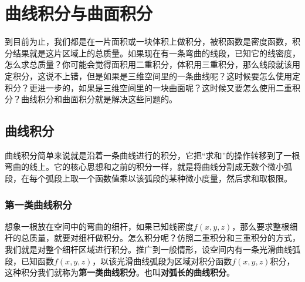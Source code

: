 \chapter{曲线积分与曲面积分}
到目前为止，我们都是在一片面积或一块体积上做积分，被积函数是密度函数，积分结果就是这片区域上的总质量。如果现在有一条弯曲的线段，已知它的线密度，怎么求总质量？你可能会觉得面积用二重积分，体积用三重积分，那么线段就该用定积分，这说不上错，但是如果是三维空间里的一条曲线呢？这时候要怎么使用定积分？更进一步的，如果是三维空间里的一块曲面呢？这时候又要怎么使用二重积分？曲线积分和曲面积分就是解决这些问题的。
\section{曲线积分}
曲线积分简单来说就是沿着一条曲线进行的积分，它把“求和”的操作转移到了一根弯曲的线上。它的核心思想和之前的积分一样，就是将曲线分割成无数个微小弧段，在每个弧段上取一个函数值乘以该弧段的某种微小度量，然后求和取极限。
\subsection{第一类曲线积分}
想象一根放在空间中的弯曲的细杆，如果已知线密度\(f(x,y,z)\)，那么要求整根细杆的总质量，就要对细杆做积分。怎么积分呢？仿照二重积分和三重积分的方式，我们就是对整个细杆区域进行积分。推广到一般情形，设空间内有一条光滑曲线弧段，已知函数\(f(x,y,z)\)，以该光滑曲线弧段为区域对积分函数\(f(x,y,z)\)积分，这种积分我们就称为\textbf{第一类曲线积分}。也叫\textbf{对弧长的曲线积分}。

